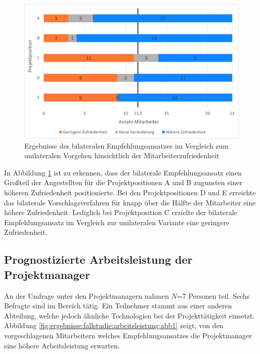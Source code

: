 \begin{figure}[h]
	\centering
	\includegraphics[width=1\textwidth]{gfx/zufriedenheit-projekte.png}	
	\caption{Ergebnisse des bilateralen Empfehlungsansatzes im Vergleich zum unilateralen Vorgehen hinsichtlich der Mitarbeiterzufriedenheit}
	\label{fig:ergebnisse:analyse:abb7}
\end{figure}
In Abbildung \ref{fig:ergebnisse:analyse:abb7} ist zu erkennen, dass der bilaterale Empfehlungsansatz einen Großteil der Angestellten für die Projektpositionen A und B zugunsten einer höheren Zufriedenheit positionierte. Bei den Projektpositionen D und E erreichte das bilaterale Vorschlagsverfahren für knapp über die Hälfte der Mitarbeiter eine höhere Zufriedenheit. Lediglich bei Projektposition C erzielte der bilaterale Empfehlungsansatz im Vergleich zur unilateralen Variante eine geringere Zufriedenheit.
\newpage
\subsection{Prognostizierte Arbeitsleistung der Projektmanager}
\label{ch:ergebnisse:fallstudie:arbeitsleistung}
An der Umfrage unter den Projektmanagern nahmen $N$=7 Personen teil. Sechs Befragte sind im Bereich \JES tätig. Ein Teilnehmer stammt aus einer anderen Abteilung, welche jedoch ähnliche Technologien bei der Projekttätigkeit einsetzt. Abbildung \ref{fig:ergebnisse:fallstudie:arbeitsleistung:abb1} zeigt, von den vorgeschlagenen Mitarbeitern welches Empfehlungsansatzes die Projektmanager eine höhere Arbeitsleistung erwarten.

